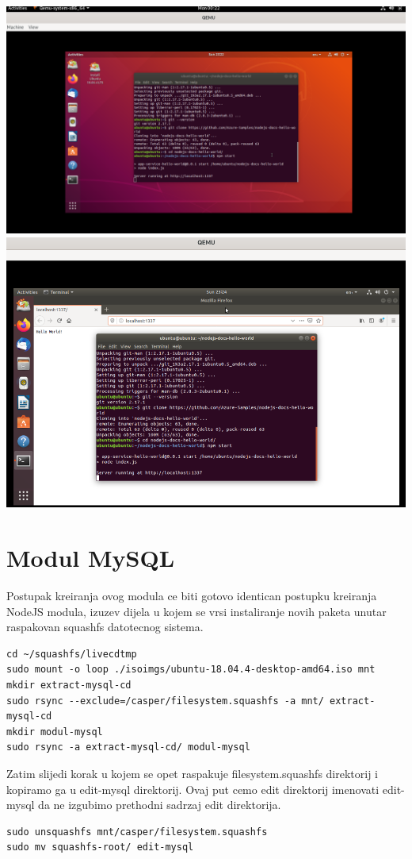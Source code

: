 \documentclass[12pt,vi]{mitthesis}
\begin{document}
\includegraphics[width=\linewidth]{images/ModulNodeJSUbuntuTerminal.png}\\
\includegraphics[width=\linewidth]{images/ModulNodeJSUbuntu1.png} 

\chapter*{Modul MySQL}
Postupak kreiranja ovog modula ce biti gotovo identican postupku kreiranja NodeJS modula, izuzev dijela u kojem se vrsi instaliranje novih paketa unutar raspakovan squashfs datotecnog sistema.\\
\begin{lstlisting}[style=BashInputStyle]
cd ~/squashfs/livecdtmp
sudo mount -o loop ./isoimgs/ubuntu-18.04.4-desktop-amd64.iso mnt
mkdir extract-mysql-cd
sudo rsync --exclude=/casper/filesystem.squashfs -a mnt/ extract-mysql-cd
mkdir modul-mysql
sudo rsync -a extract-mysql-cd/ modul-mysql
\end{lstlisting}
Zatim slijedi korak u kojem se opet raspakuje filesystem.squashfs direktorij i kopiramo ga u edit-mysql direktorij. Ovaj put cemo edit direktorij imenovati edit-mysql da ne izgubimo prethodni sadrzaj edit direktorija.\\
\begin{lstlisting}[style=BashInputStyle]
sudo unsquashfs mnt/casper/filesystem.squashfs
sudo mv squashfs-root/ edit-mysql
\end{lstlisting}
\end{document}
